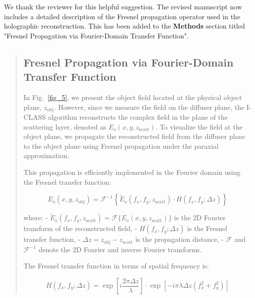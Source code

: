 \documentclass[12pt]{article}
\newenvironment{ourresponse}
    {\begin{tcolorbox}[width=\linewidth,breakable,enhanced,colback=gray!5,colframe=responsecolor!50,title=Response,left=5pt,right=5pt]}
    {\end{tcolorbox}}
\begin{document}
\begin{enumerate}[label=\arabic*.]
\begin{ourresponse}
    We thank the reviewer for this helpful suggestion. The revised manuscript now includes a detailed description of the Fresnel propagation operator used in the holographic reconstruction. This has been added to the \textbf{Methods} section titled "Fresnel Propagation via Fourier-Domain Transfer Function".
    \begin{quote}
        \subsection*{Fresnel Propagation via Fourier-Domain Transfer Function}
        \label{Fresnel_propagation}
        In Fig.~\ref{fig_5}, we present the object field located at the physical object plane, $z_{\text{obj}}$. However, since we measure the field on the diffuser plane, the I-CLASS algorithm reconstructs the complex field in the plane of the scattering layer, denoted as $E_o(x, y, z_{\text{scatt}})$. To visualize the field at the object plane, we propagate the reconstructed field from the diffuser plane to the object plane using Fresnel propagation under the paraxial approximation.
        
        This propagation is efficiently implemented in the Fourier domain using the Fresnel transfer function:
        
        \begin{equation}
            E_o(x, y, z_{\text{obj}}) = \mathcal{F}^{-1} \left\{ \tilde{E}_o(f_x, f_y, z_{\text{scatt}}) \cdot H(f_x, f_y; \Delta z) \right\}
        \end{equation}
        
        where:
        - $ \tilde{E}_o(f_x, f_y, z_{\text{scatt}}) = \mathcal{F}\{ E_o(x, y, z_{\text{scatt}}) \} $ is the 2D Fourier transform of the reconstructed field,
        - $ H(f_x, f_y; \Delta z) $ is the Fresnel transfer function,
        - $ \Delta z = z_{\text{obj}} - z_{\text{scatt}} $ is the propagation distance,
        - $ \mathcal{F} $ and $ \mathcal{F}^{-1} $ denote the 2D Fourier and inverse Fourier transforms.
        
        The Fresnel transfer function in terms of spatial frequency is:
        
        \begin{equation}
            H(f_x, f_y; \Delta z) = \exp\left[ i \frac{2\pi \Delta z}{\lambda} \right] \cdot \exp\left[ -i \pi \lambda \Delta z (f_x^2 + f_y^2) \right]
        \end{equation}
        

\end{quote}
\end{ourresponse}
\end{enumerate}
\end{document}
